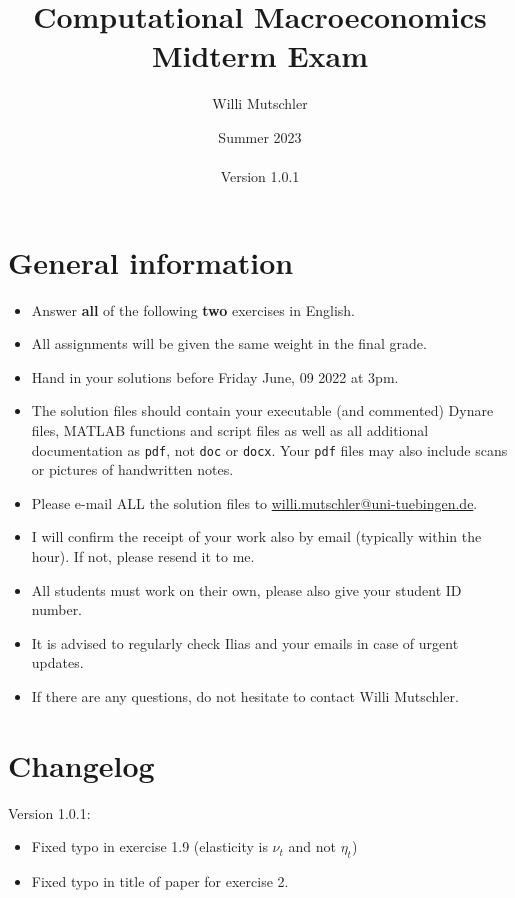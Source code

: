 \documentclass{article}
\begin{document}
	
\title{Computational Macroeconomics\\Midterm Exam}
\author{Willi Mutschler}
\date{Summer 2023\\~\\Version 1.0.1}
\maketitle

\section*{General information}
\begin{itemize}
\item Answer \textbf{all} of the following \textbf{two} exercises in English.
\item All assignments will be given the same weight in the final grade.
\item Hand in your solutions before Friday June, 09 2022 at 3pm.
\item The solution files should contain your executable (and commented) Dynare files, MATLAB functions and script files
  as well as all additional documentation as \texttt{pdf}, not \texttt{doc} or \texttt{docx}.
Your \texttt{pdf} files may also include scans or pictures of handwritten notes.
\item Please e-mail ALL the solution files to \url{willi.mutschler@uni-tuebingen.de}.
\item I will confirm the receipt of your work also by email (typically within the hour). If not, please resend it to me.
\item All students must work on their own, please also give your student ID number.
\item It is advised to regularly check Ilias and your emails in case of urgent updates.
\item If there are any questions, do not hesitate to contact Willi Mutschler.
\end{itemize}

\section*{Changelog}
Version 1.0.1:
\begin{itemize}
	\item Fixed typo in exercise 1.9 (elasticity is $\nu_t$ and not $\eta_t$)
	\item Fixed typo in title of paper for exercise 2.
\end{itemize}
\end{document}
